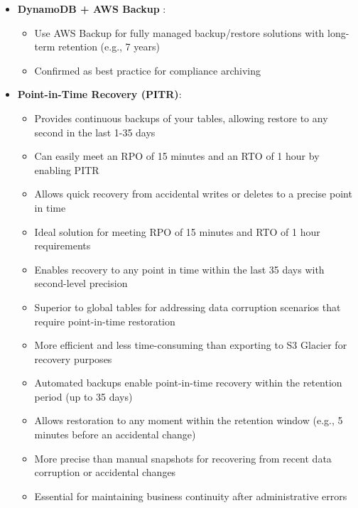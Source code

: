 \documentclass[11pt,a4paper]{report}
\begin{document}
\begin{itemize}
\begin{itemize}
\begin{itemize}
  \item Superior to global tables for optimizing read performance of applications in a single region
  \item Operates as a fully managed, highly available in-memory cache specifically designed for DynamoDB
  \item Particularly valuable for organizations with limited staff to handle additional operational overhead
\end{itemize}
\end{itemize}
  \item \textbf{DynamoDB + AWS Backup} :
\begin{itemize}
  \item Use AWS Backup for fully managed backup/restore solutions with long-term retention (e.g., 7 years)
  \item Confirmed as best practice for compliance archiving
\end{itemize}
  \item \textbf{Point-in-Time Recovery (PITR)}:
\begin{itemize}
  \item Provides continuous backups of your tables, allowing restore to any second in the last 1-35 days
  \item Can easily meet an RPO of 15 minutes and an RTO of 1 hour by enabling PITR
  \item Allows quick recovery from accidental writes or deletes to a precise point in time
  \item Ideal solution for meeting RPO of 15 minutes and RTO of 1 hour requirements
  \item Enables recovery to any point in time within the last 35 days with second-level precision
  \item Superior to global tables for addressing data corruption scenarios that require point-in-time restoration
  \item More efficient and less time-consuming than exporting to S3 Glacier for recovery purposes
  \item Automated backups enable point-in-time recovery within the retention period (up to 35 days)
  \item Allows restoration to any moment within the retention window (e.g., 5 minutes before an accidental change)
  \item More precise than manual snapshots for recovering from recent data corruption or accidental changes
  \item Essential for maintaining business continuity after administrative errors

\end{itemize}
\end{itemize}
\end{document}
